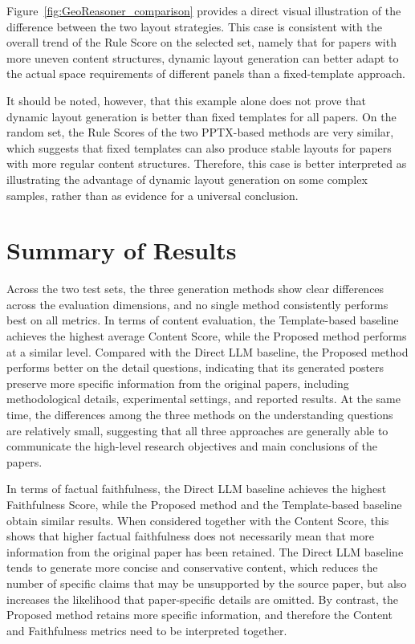 \documentclass[12pt,oneside]{report}
\begin{document}
Figure~\ref{fig:GeoReasoner_comparison} provides a direct visual illustration of the difference between the two layout strategies. This case is consistent with the overall trend of the Rule Score on the selected set, namely that for papers with more uneven content structures, dynamic layout generation can better adapt to the actual space requirements of different panels than a fixed-template approach.

\vspace{1em}

It should be noted, however, that this example alone does not prove that dynamic layout generation is better than fixed templates for all papers. On the random set, the Rule Scores of the two PPTX-based methods are very similar, which suggests that fixed templates can also produce stable layouts for papers with more regular content structures. Therefore, this case is better interpreted as illustrating the advantage of dynamic layout generation on some complex samples, rather than as evidence for a universal conclusion.


\section{Summary of Results}

Across the two test sets, the three generation methods show clear differences across the evaluation dimensions, and no single method consistently performs best on all metrics. In terms of content evaluation, the Template-based baseline achieves the highest average Content Score, while the Proposed method performs at a similar level. Compared with the Direct LLM baseline, the Proposed method performs better on the detail questions, indicating that its generated posters preserve more specific information from the original papers, including methodological details, experimental settings, and reported results. At the same time, the differences among the three methods on the understanding questions are relatively small, suggesting that all three approaches are generally able to communicate the high-level research objectives and main conclusions of the papers.

\vspace{1em}

In terms of factual faithfulness, the Direct LLM baseline achieves the highest Faithfulness Score, while the Proposed method and the Template-based baseline obtain similar results. When considered together with the Content Score, this shows that higher factual faithfulness does not necessarily mean that more information from the original paper has been retained. The Direct LLM baseline tends to generate more concise and conservative content, which reduces the number of specific claims that may be unsupported by the source paper, but also increases the likelihood that paper-specific details are omitted. By contrast, the Proposed method retains more specific information, and therefore the Content and Faithfulness metrics need to be interpreted together.
\end{document}
